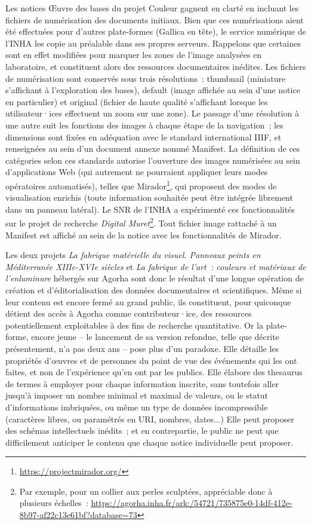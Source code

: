 \documentclass[a4paper,12pt, twoside]{book}
\begin{document}
Les notices \textsf{Œuvre} des bases du projet Couleur gagnent en clarté en incluant les fichiers de numérisation des documents initiaux. Bien que ces numérisations aient été effectuées pour d’autres plate-formes (Gallica en tête), le service numérique de l’INHA les copie au préalable dans ses propres serveurs. Rappelons que certaines sont en effet modifiées pour marquer les zones de l’image analysées en laboratoire, et constituent alors des ressources documentaires inédites. Les fichiers de numérisation sont conservés sous trois résolutions~: \textsf{thumbnail} (miniature s’affichant à l’exploration des bases), \textsf{default} (image affichée au sein d’une notice en particulier) et \textsf{original} (fichier de haute qualité s’affichant lorsque les utilisateur·ices effectuent un zoom sur une zone). Le passage d’une résolution à une autre suit les fonctions des images à chaque étape de la navigation~; les dimensions sont fixées en adéquation avec le standard international IIIF, et renseignées au sein d’un document annexe nommé \textsf{Manifest}. La définition de ces catégories selon ces standards autorise l’ouverture des images numérisées au sein d’applications Web (qui autrement ne pourraient appliquer leurs modes opératoires automatisés), telles que Mirador\footnote{\url{https://projectmirador.org/}}, qui proposent des modes de visualisation enrichis (toute information souhaitée peut être intégrée librement dans un panneau latéral). Le SNR de l’INHA a expérimenté ces fonctionnalités sur le projet de recherche \textit{Digital Muret}\footnote{Par exemple, pour un collier aux perles sculptées, appréciable donc à plusieurs échelles~: \url{https://agorha.inha.fr/ark:/54721/735875e0-14df-412e-8b97-af22c13e61bf?database=73}}. Tout fichier image rattaché à un \textsf{Manifest} est affiché au sein de la notice avec les fonctionnalités de Mirador.

Les deux projets \textit{La fabrique matérielle du visuel. Panneaux peints en Méditerranée XIIIe-XVIe siècles} et \textit{La fabrique de l’art~: couleurs et matériaux de l’enluminure} hébergés sur Agorha sont donc le résultat d’une longue opération de création et d’éditorialisation des données documentaires et scientifiques. Même si leur contenu est encore fermé au grand public, ils constituent, pour quiconque détient des accès à Agorha comme contributeur·ice, des ressources potentiellement exploitables à des fins de recherche quantitative. Or la plate-forme, encore jeune – le lancement de sa version refondue, telle que décrite présentement, n’a pas deux ans – pose plus d’un paradoxe. Elle détaille les propriétés d’œuvres et de personnes du point de vue des événements qui les ont faites, et non de l’expérience qu’en ont par les publics. Elle élabore des thesaurus de termes à employer pour chaque information inscrite, sans toutefois aller jusqu’à imposer un nombre minimal et maximal de valeurs, ou le statut d’informations imbriquées, ou même un type de données incompressible (caractères libres, ou paramétrés en URI, nombres, dates...) Elle peut proposer des schémas intellectuels inédits~; et en contrepartie, le public ne peut que difficilement anticiper le contenu que chaque notice individuelle peut proposer.
\end{document}
